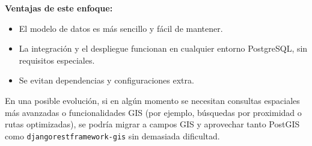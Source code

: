 \textbf{Ventajas de este enfoque:}
\begin{itemize}
    \item El modelo de datos es más sencillo y fácil de mantener.
    \item La integración y el despliegue funcionan en cualquier entorno PostgreSQL, sin requisitos especiales.
    \item Se evitan dependencias y configuraciones extra.
\end{itemize}

En una posible evolución, si en algún momento se necesitan consultas espaciales más avanzadas o funcionalidades GIS (por ejemplo, búsquedas por proximidad o rutas optimizadas), se podría migrar a campos GIS y aprovechar tanto PostGIS como \mbox{\texttt{djangorestframework-gis}} sin demasiada dificultad.